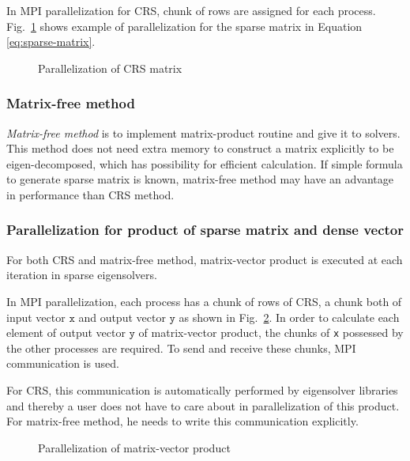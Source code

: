 \documentclass[12pt]{article}
\newcommand\figref[1]{Fig.~\ref{#1}}
\begin{document}
In MPI parallelization for CRS, chunk of rows are assigned for each process.
\figref{fig:parallel-crs} shows example of parallelization for the sparse matrix in Equation \eqref{eq:sparse-matrix}.
\begin{figure}[!htbp]
\centering\caption{Parallelization of CRS matrix}\label{fig:parallel-crs}
\end{figure}


\subsubsection{Matrix-free method}
\emph{Matrix-free method} is to implement matrix-product routine and give it to solvers.
This method does not need extra memory to construct a matrix explicitly to be eigen-decomposed, which has possibility for efficient calculation.
If simple formula to generate sparse matrix is known, matrix-free method may have an advantage in performance than CRS method.

\subsubsection{Parallelization for product of sparse matrix and dense vector}
For both CRS and matrix-free method, matrix-vector product is executed at each iteration in sparse eigensolvers.

In MPI parallelization, each process has a chunk of rows of CRS, a chunk both of input vector $\texttt{x}$ and output vector $\texttt{y}$ as shown in \figref{fig:parallel-matrix-vector-product}.
In order to calculate each element of output vector $\texttt{y}$ of matrix-vector product, the chunks of \texttt{x} possessed by the other processes are required.
To send and receive these chunks, MPI communication is used.

For CRS, this communication is automatically performed by eigensolver libraries and thereby a user does not have to care about in parallelization of this product.
For matrix-free method, he needs to write this communication explicitly.

\begin{figure}[!htbp]
\centering\caption{Parallelization of matrix-vector product}\label{fig:parallel-matrix-vector-product}
\end{figure}
\end{document}
